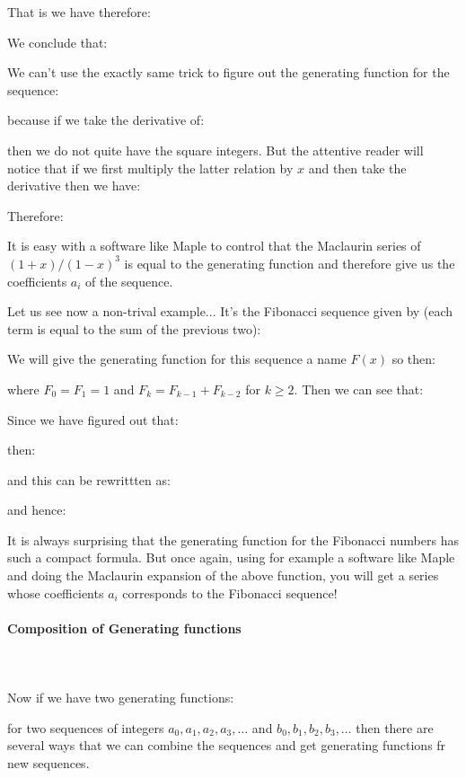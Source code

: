 	That is we have therefore:
	
	We conclude that:
	
	We can't use the exactly same trick to figure out the generating function for the sequence:
	
	because if we take the derivative of:
	
	then we do not quite have the square integers. But the attentive reader will notice that if we first multiply the latter relation by $x$ and then take the derivative then we have:
	
	Therefore:
	
	It is easy with a software like Maple to control that the Maclaurin series of $(1+x)/(1-x)^3$ is equal to the generating function and therefore give us the coefficients $a_i$ of the sequence.
	
	Let us see now a non-trival example... It's the Fibonacci sequence given by (each term is equal to the sum of the previous two):
	
	We will give the generating function for this sequence a name $F(x)$ so then:
	
	where $F_0=F_1=1$ and $F_k=F_{k-1}+F_{k-2}$ for $k\geq 2$. Then we can see that:
	
	Since we have figured out that:
	
	then:
	
	and this can be rewrittten as:
	
	and hence:
	
	It is always surprising that the generating function for the Fibonacci numbers has such a compact formula. But once again, using for example a software like Maple and doing the Maclaurin expansion of the above function, you will get a series whose coefficients $a_i$ corresponds to the Fibonacci sequence!
		
	\paragraph{Composition of Generating functions}\mbox{}\\\\
	Now if we have two generating functions:
	
	for two sequences of integers $a_0,a_1,a_2,a_3,\ldots$ and $b_0,b_1,b_2,b_3,\ldots$ then there are several ways that we can combine the sequences and get generating functions fr new sequences.

